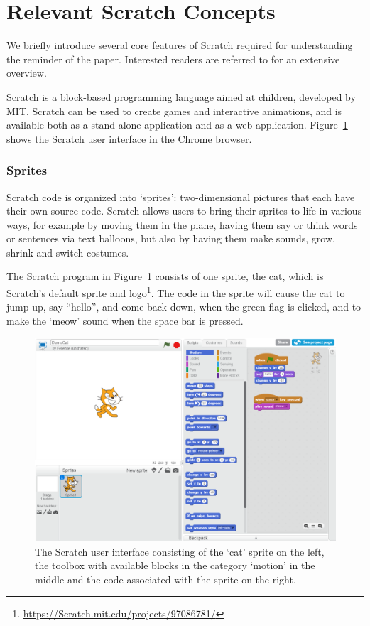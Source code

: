 \documentclass[conference]{IEEEtran}
\begin{document}
\section{Relevant Scratch Concepts}
\label{sec:Scratch}
We briefly introduce several core features of Scratch required for understanding the reminder of the paper. 
Interested readers are referred to \cite{brennan_creative_2014} for an extensive overview.  

Scratch is a block-based programming language aimed at children, developed by MIT. Scratch can be used to create games and interactive animations, and is available both as a stand-alone application and as a web application. Figure~\ref{fig:ui} shows the Scratch user interface in the Chrome browser.

\subsubsection{Sprites}
Scratch code is organized into `sprites': two-dimensional pictures that each have their own source code. Scratch allows users to bring their sprites to life in various ways, for example by moving them in the plane, having them say or think words or sentences via text balloons, but also by having them make sounds, grow, shrink and switch costumes. 

The Scratch program in Figure~\ref{fig:ui} consists of one sprite, the cat, which is Scratch's default sprite and logo\footnote{\url{https://Scratch.mit.edu/projects/97086781/}}. The code in the sprite will cause the cat to jump up, say ``hello'', and come back down, when the green flag is clicked, and to make the `meow' sound when the space bar is pressed.

\begin{figure}
  \begin{center}
  \includegraphics[width=\columnwidth]{fig/ui.png}
  \caption{The Scratch user interface consisting of the `cat' sprite on the left, the toolbox with available blocks in the category `motion' in the middle and the code associated with the sprite on the right.}
  \label{fig:ui}
  \end{center}
\end{figure} 
\end{document}
